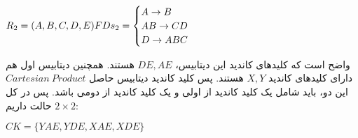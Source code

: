 \setLTR
$
R_2 = (A,B,C,D,E)\\ \\
FDs_2=\begin{cases}
	A\rightarrow B \\  AB\rightarrow CD \\ D\rightarrow ABC
\end{cases}
$
\setRTL

واضح است که کلیدهای کاندید این دیتابیس، $DE , AE$ هستند. همچنین دیتابیس اول هم دارای کلیدهای کاندید $X,Y$ هستند. پس کلید کاندید دیتابیس حاصل 
$Cartesian \ Product$
این دو، باید شامل یک کلید کاندید از اولی و یک کلید کاندید از دومی باشد. پس در کل $2\times 2$
حالت داریم:


\setLTR
$
CK=\{
YAE,YDE,XAE,XDE
\}
$
\setRTL














